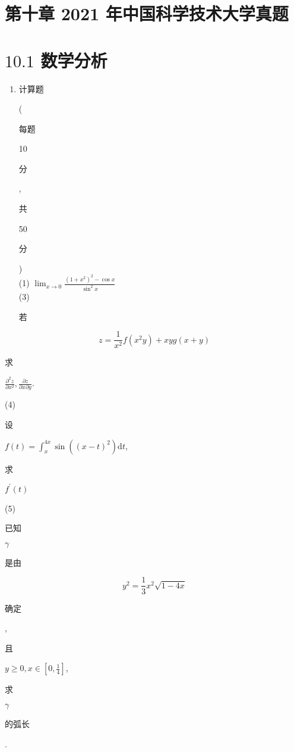 \documentclass[10pt]{article}
\begin{document}
\section{第十章 2021 年中国科学技术大学真题}
\section{$10.1$ 数学分析}
\begin{enumerate}
  \item \begin{CJK}{UTF8}{mj}计算题\end{CJK} (\begin{CJK}{UTF8}{mj}每题\end{CJK} 10 \begin{CJK}{UTF8}{mj}分\end{CJK}, \begin{CJK}{UTF8}{mj}共\end{CJK} 50 \begin{CJK}{UTF8}{mj}分\end{CJK})\\
(1) $\lim _{x \rightarrow 0} \frac{\left(1+x^{2}\right)^{2}-\cos x}{\sin ^{2} x}$\\
(3) \begin{CJK}{UTF8}{mj}若\end{CJK}
\end{enumerate}
$$
z=\frac{1}{x^{2}} f\left(x^{2} y\right)+x y g(x+y)
$$
\begin{CJK}{UTF8}{mj}求\end{CJK} $\frac{\partial^{2} z}{\partial x^{2}}, \frac{\partial z}{\partial x \partial y}$.

(4) \begin{CJK}{UTF8}{mj}设\end{CJK} $f(t)=\int_{x}^{4 x} \sin \left((x-t)^{2}\right) \mathrm{d} t$, \begin{CJK}{UTF8}{mj}求\end{CJK} $f^{\prime}(t)$

(5) \begin{CJK}{UTF8}{mj}已知\end{CJK} $\gamma$ \begin{CJK}{UTF8}{mj}是由\end{CJK}
$$
y^{2}=\frac{1}{3} x^{2} \sqrt{1-4 x}
$$
\begin{CJK}{UTF8}{mj}确定\end{CJK}, \begin{CJK}{UTF8}{mj}且\end{CJK} $y \geq 0, x \in\left[0, \frac{1}{4}\right]$, \begin{CJK}{UTF8}{mj}求\end{CJK} $\gamma$ \begin{CJK}{UTF8}{mj}的弧长\end{CJK}.
\end{document}
